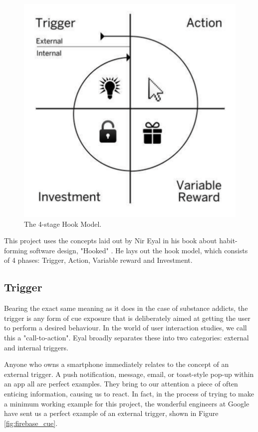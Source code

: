 \begin{figure}[h]
    \begin{center}
        \includegraphics[scale=0.3]{images/hook_model.png}
    \end{center}
    \caption{The 4-stage Hook Model.}
    \label{hook_model}
\end{figure}

This project uses the concepts laid out by Nir Eyal in his book about habit-forming software design, "Hooked" \cite{eyal2014hooked}. He lays out the hook model, which consists of 4 phases: Trigger, Action, Variable reward and Investment.

\subsection{Trigger}
Bearing the exact same meaning as it does in the case of substance addicts, the trigger is any form of cue exposure that is deliberately aimed at getting the user to perform a desired behaviour. In the world of user interaction studies, we call this a "call-to-action".  Eyal broadly separates these into two categories: external and internal triggers.

Anyone who owns a smartphone immediately relates to the concept of an external trigger. A push notification, message, email, or toast-style pop-up within an app all are perfect examples. They bring to our attention a piece of often enticing information, causing us to react. In fact, in the process of trying to make a minimum working example for this project, the wonderful engineers at Google have sent us a perfect example of an external trigger, shown in Figure \ref{fig:firebase_cue}.

